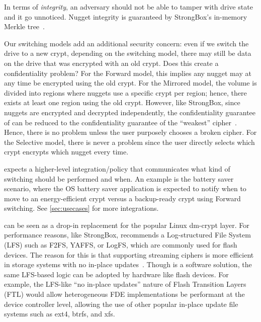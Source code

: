 In terms of {\em integrity}, an adversary should not be able to tamper with
drive state and it go unnoticed. Nugget integrity is guaranteed by StrongBox's
in-memory Merkle tree~\cite{StrongBox}.

Our switching models add an additional security concern: even if we switch the
drive to a new crypt, depending on the switching model, there may still be data
on the drive that was encrypted with an old crypt. Does this create a
confidentiality problem? For the Forward model, this implies any nugget may at
any time be encrypted using the old crypt. For the Mirrored model, the volume is
divided into regions where nuggets use a specific crypt per region; hence, there
exists at least one region using the old crypt. However, like StrongBox, since
nuggets are encrypted and decrypted independently, the confidentiality guarantee
of \sys can be reduced to the confidentiality guarantee of the ``weakest''
cipher~\cite{StrongBox}. Hence, there is no problem unless the user purposely
chooses a broken cipher. For the Selective model, there is never a problem since
the user directly selects which crypt encrypts which nugget every time.

 \sys expects a higher-level integration/policy
that communicates what kind of switching should be performed and when. An
example is the battery saver scenario, where the OS battery saver application is
expected to notify \sys when to move to an energy-efficient crypt versus a
backup-ready crypt using Forward switching. See \cref*{sec:usecases} for more
integrations.

 \sys can be seen as a drop-in replacement for the popular
Linux dm-crypt layer. For performance reasons, like StrongBox, \sys recommends a
Log-structured File System (LFS) such as F2FS, YAFFS, or LogFS, which are
commonly used for flash devices. The reason for this is that supporting
streaming ciphers is more efficient in storage systems with no in-place
updates~\cite{StrongBox}. Though \sys is a software solution, the same LFS-based
logic can be adopted by hardware like flash devices. For example, the LFS-like
``no in-place updates'' nature of Flash Transition Layers (FTL) would allow
heterogeneous FDE implementations be performant at the device controller level,
allowing the use of other popular in-place update file systems such as ext4,
btrfs, and xfs.
